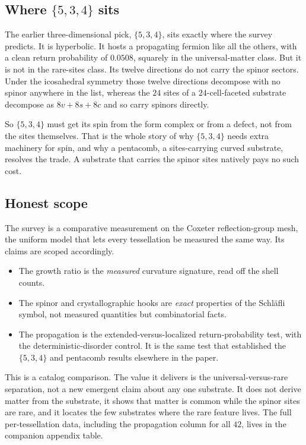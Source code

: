 \subsection{Where $\{5,3,4\}$ sits}

The earlier three-dimensional pick, $\{5,3,4\}$, sits exactly where the survey predicts. It is hyperbolic. It hosts a propagating fermion like all the others, with a clean return probability of $0.0508$, squarely in the universal-matter class. But it is not in the rare-sites class. Its twelve directions do not carry the spinor sectors. Under the icosahedral symmetry those twelve directions decompose with no spinor anywhere in the list, whereas the $24$ sites of a $24$-cell-faceted substrate decompose as $8v + 8s + 8c$ and so carry spinors directly.

So $\{5,3,4\}$ must get its spin from the form complex or from a defect, not from the sites themselves. That is the whole story of why $\{5,3,4\}$ needs extra machinery for spin, and why a pentacomb, a sites-carrying curved substrate, resolves the trade. A substrate that carries the spinor sites natively pays no such cost.

\subsection{Honest scope}

The survey is a comparative measurement on the Coxeter reflection-group mesh, the uniform model that lets every tessellation be measured the same way. Its claims are scoped accordingly.

\begin{itemize}
\item The growth ratio is the \emph{measured} curvature signature, read off the shell counts.
\item The spinor and crystallographic hooks are \emph{exact} properties of the Schl\"afli symbol, not measured quantities but combinatorial facts.
\item The propagation is the extended-versus-localized return-probability test, with the deterministic-disorder control. It is the same test that established the $\{5,3,4\}$ and pentacomb results elsewhere in the paper.
\end{itemize}

This is a catalog comparison. The value it delivers is the universal-versus-rare separation, not a new emergent claim about any one substrate. It does not derive matter from the substrate, it shows that matter is common while the spinor sites are rare, and it locates the few substrates where the rare feature lives. The full per-tessellation data, including the propagation column for all $42$, lives in the companion appendix table.

